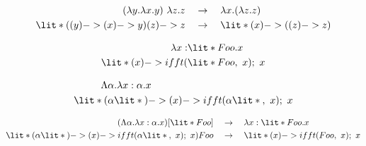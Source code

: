 \documentclass[11hpt]{article}
\begin{document}
\begin{align*}
(\lambda y.\lambda x.y) \ \lambda z.z \quad &\to \quad \lambda x.(\lambda z.z) \\
\lit*{((y) -> (x) -> y) (z) -> z} \quad &\to \quad \lit*{(x) -> ((z) -> z)}
\end{align*}

 \begin{align*}
\lambda x:&\lit*{Foo}.x \\
\lit*{(x) -> ifft(}&\lit*{Foo,\ x); \ x} \\
\end{align*}

\begin{align*}
\Lambda&\alpha.\lambda x:\alpha.x \\
\lit*{(}&\alpha\lit*{) -> (x) -> ifft(} \alpha \lit*{,\ x); \ x} \\
\end{align*}

\begin{align*}
(\Lambda\alpha.\lambda x:\alpha.x) [\lit*{Foo}] \quad &\to \quad \lambda x:\lit*{Foo}.x \\
\lit*{(}\alpha\lit*{) -> (x) -> ifft(} \alpha \lit*{,\ x); \ x) Foo} \quad &\to \quad \lit*{(x) -> ifft(Foo,\ x); \ x}
\end{align*}
\end{document}
